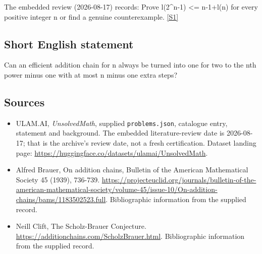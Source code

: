 \documentclass[11pt,a4paper]{article}
\newcommand{\sref}[2]{\hyperlink{source:#1:#2}{[S#2]}}
\begin{document}
The embedded review (2026-08-17) records: Prove l(2\textasciicircum{}n-1) <= n-1+l(n) for every positive integer n or find a genuine counterexample. \sref{statement}{1}

\subsection{Short English statement}

Can an efficient addition chain for n always be turned into one for two to the nth power minus one with at most n minus one extra steps?

\subsection{Sources}

{\small

\begin{itemize}

\item[\hypertarget{source:statement:1}{S1}] ULAM.AI, \emph{UnsolvedMath}, supplied \texttt{problems.json}, catalogue entry, statement and background. The embedded literature-review date is 2026-08-17; that is the archive’s review date, not a fresh certification. Dataset landing page: \url{https://huggingface.co/datasets/ulamai/UnsolvedMath}.

\item[\hypertarget{source:statement:2}{S2}] Alfred Brauer, On addition chains, Bulletin of the American Mathematical Society 45 (1939), 736-739. \url{https://projecteuclid.org/journals/bulletin-of-the-american-mathematical-society/volume-45/issue-10/On-addition-chains/bams/1183502523.full}. Bibliographic information from the supplied record.

\item[\hypertarget{source:statement:3}{S3}] Neill Clift, The Scholz-Brauer Conjecture. \url{https://additionchains.com/ScholzBrauer.html}. Bibliographic information from the supplied record.

\end{itemize}

}

\label{end:statement}
\end{document}
